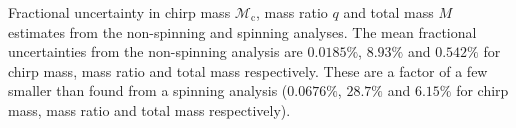 \label{fig:mass_std} Fractional uncertainty in chirp mass $\mathcal{M}_\mathrm{c}$, mass ratio $q$ and total mass $M$ estimates from the non-spinning and spinning analyses.  The mean fractional uncertainties from the non-spinning analysis are $0.0185\%$, $8.93\%$ and $0.542\%$ for chirp mass, mass ratio and total mass respectively.  These are a factor of a few smaller than found from a spinning analysis ($0.0676\%$, $28.7\%$ and $6.15\%$ for chirp mass, mass ratio and total mass respectively).
  
  
  